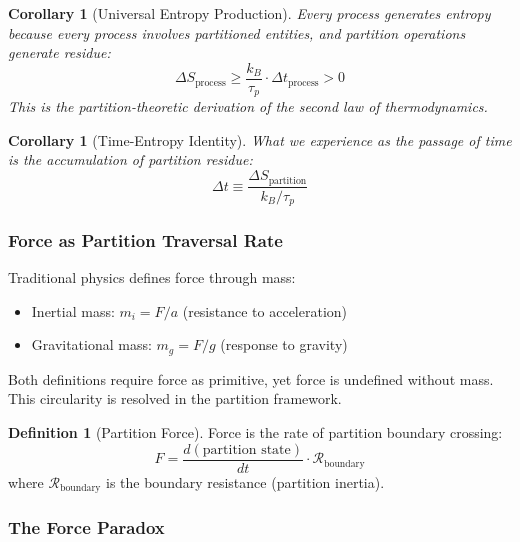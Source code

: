 \documentclass[twocolumn,10pt,a4paper]{article}
\newtheorem{corollary}[theorem]{Corollary}
\theoremstyle{definition}
\newtheorem{definition}[theorem]{Definition}
\theoremstyle{remark}
\begin{document}
\begin{corollary}[Universal Entropy Production]
\label{cor:universal_entropy}
Every process generates entropy because every process involves partitioned entities, and partition operations generate residue:
\begin{equation}
    \Delta S_{\text{process}} \geq \frac{k_B}{\tau_p} \cdot \Delta t_{\text{process}} > 0
\end{equation}
This is the partition-theoretic derivation of the second law of thermodynamics.
\end{corollary}

\begin{corollary}[Time-Entropy Identity]
What we experience as the passage of time \emph{is} the accumulation of partition residue:
\begin{equation}
    \Delta t \equiv \frac{\Delta S_{\text{partition}}}{k_B / \tau_p}
\end{equation}
\end{corollary}

\subsubsection{Force as Partition Traversal Rate}

Traditional physics defines force through mass:
\begin{itemize}
    \item Inertial mass: $m_i = F/a$ (resistance to acceleration)
    \item Gravitational mass: $m_g = F/g$ (response to gravity)
\end{itemize}
Both definitions require force as primitive, yet force is undefined without mass. This circularity is resolved in the partition framework.

\begin{definition}[Partition Force]
\label{def:partition_force}
Force is the rate of partition boundary crossing:
\begin{equation}
    F = \frac{d(\text{partition state})}{dt} \cdot \mathcal{R}_{\text{boundary}}
\end{equation}
where $\mathcal{R}_{\text{boundary}}$ is the boundary resistance (partition inertia).
\end{definition}

\subsubsection{The Force Paradox}
\end{document}

